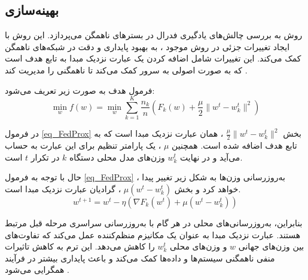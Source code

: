 \subsection{
بهینه‌سازی
}
روش
به بررسی چالش‌های یادگیری فدرال در بسترهای ناهمگن می‌پردازد. این روش با ایجاد تغییرات جزئی در روش موجود
%
، به بهبود پایداری و دقت در شبکه‌های ناهمگن کمک می‌کند. این تغییرات شامل اضافه کردن یک عبارت نزدیک مبدا%
به تابع هدف است که به صورت اصولی به سرور کمک می‌کند تا ناهمگنی را مدیریت کند
\cite{li2020federatedheteroneneous}.

فرمول هدف
به صورت زیر تعریف می‌شود:
\begin{equation}
\min_{w} f(w) = \min_{w} \sum_{k=1}^{K} \frac{n_k}{n} \left( F_k(w) + \frac{\mu}{2} \|w^t - w_k^t\|^2 \right)
\label{eq_FedProx}
\end{equation}

در فرمول
\ref{eq_FedProx}
بخش
$\frac{\mu}{2} \|w^t - w_k^t\|^2$%
، همان عبارت نزدیک مبدا است که به تابع هدف اضافه شده است. همچنین
$\mu$%
، یک پارامتر تنظیم برای این عبارت به حساب می‌آید و در نهایت
$w_k^t$
وزن‌های مدل محلی دستگاه
$k$
در تکرار
$t$
است.

حال با توجه به فرمول
\ref{eq_FedProx}%
، به‌روزرسانی وزن‌ها به شکل زیر تغییر پیدا خواهد کرد و بخش
$\mu (w^t - w_k^t)$%
، گرادیان عبارت نزدیک مبدا است.
\begin{equation*}
w^{t+1} = w^t - \eta (\nabla F_k(w^t) + \mu (w^t - w_k^t))
\end{equation*}

بنابراین، به‌روزرسانی‌های محلی در هر گام با به‌روزرسانی سراسری مرحله قبل مرتبط هستند. عبارت نزدیک مبدا به عنوان یک مکانیزم منظم‌کننده%
عمل می‌کند که تفاوت‌های بین وزن‌های جهانی
$w$
و وزن‌های محلی
$w_k^t$
را کاهش می‌دهد. این ترم به کاهش تاثیرات منفی ناهمگنی سیستم‌ها و داده‌ها کمک می‌کند و باعث پایداری بیشتر در فرآیند همگرایی می‌شود
\cite{li2020federatedheteroneneous}.

